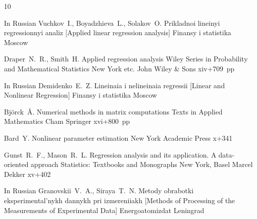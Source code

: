 \newpage

\makeentitle

\vspace{-5mm}






\begin{thebibliography}{10}

\lang In Russian
\by Vuchkov~I., Boyadzhieva~L., Solakov~O.
\book Prikladnoi lineinyi regressionnyi analiz \rm [Applied linear regression analysis]
\publ Finansy i statistika
\publaddr Moscow



\by Draper~N.~R., Smith~H.  
\book Applied regression analysis
\serial Wiley Series in Probability and Mathematical Statistics
\publaddr New York etc.
\publ John Wiley \& Sons
\totalpages xiv+709~pp \nofrills
{}

\lang In Russian
\by Demidenko~E.~Z.
\book Lineinaia i nelineinaia regressii \rm [Linear and Nonlinear Regression]
\publ Finansy i statistika
\publaddr Moscow


\by Bj\"orck~\AA.
\book Numerical methods in matrix computations
\serial Texts in Applied Mathematics 
\publaddr Cham
\publ Springer 
\totalpages xvi+800~pp \nofrills 
{}

\by Bard~Y.
\book Nonlinear parameter estimation
\publaddr New York
\publ Academic Press
\totalpages x+341 


\by Gunst~R.~F., Mason~R.~L.
\book Regression analysis and its application. A data-oriented approach
\serial Statistics: Textbooks and Monographs
\publaddr New York, Basel
\publ Marcel Dekker
\totalpages xv+402 


\lang In Russian
\by Granovskii~V.~A., Siraya~T.~N. 
\book Metody obrabotki eksperimental'nykh dannykh pri izmereniiakh \rm [Methods of Processing of the Measurements of Experimental Data]
\publ Energoatomizdat
\publaddr Leningrad


\end{thebibliography}
